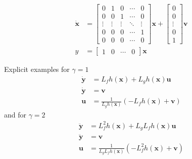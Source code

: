 \begin{align*}
    \dot{\mathbf{x}} & = \begin{bmatrix}
                             0      & 1      & 0      & \cdots & 0      \\
                             0      & 0      & 1      & \cdots & 0      \\
                             \vdots & \vdots & \vdots & \ddots & \vdots \\
                             0      & 0      & 0      & \cdots & 1      \\
                             0      & 0      & 0      & \cdots & 0
                         \end{bmatrix}
    \mathbf{x} +
    \begin{bmatrix}
        0      \\
        0      \\
        \vdots \\
        0      \\
        1
    \end{bmatrix}
    \mathbf{v}                                                      \\
    y                & = \begin{bmatrix}
                             1 & 0 & \cdots & 0
                         \end{bmatrix}
    \mathbf{x}
\end{align*}

\newpar{}
Explicit examples for $\gamma = 1$ %
\begin{align*}
    \dot{\mathbf{y}\mathbf{}} & = L_f h(\mathbf{x}) + L_g h(\mathbf{x}) \mathbf{u}             \\
    \dot{\mathbf{y}}          & = \mathbf{v}                                                   \\
    \mathbf{u}                & = \frac{1}{L_g h(\mathbf{x})}(-L_f h(\mathbf{x}) + \mathbf{v})
\end{align*}
and for $\gamma = 2$
\begin{align*}
    \ddot{\mathbf{y}} & = L_f^2 h(\mathbf{x}) + L_g L_f h(\mathbf{x}) \mathbf{u}             \\
    \ddot{\mathbf{y}} & = \mathbf{v}                                                         \\
    \mathbf{u}        & = \frac{1}{L_g L_f h(\mathbf{x})}(-L_f^2 h(\mathbf{x}) + \mathbf{v})
\end{align*}

